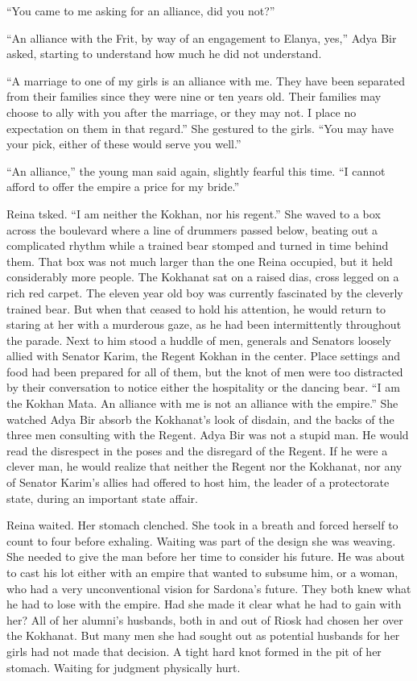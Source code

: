 \documentclass{article}
\begin{document}
	“You came to me asking for an alliance, did you not?”
	
	“An alliance with the Frit, by way of an engagement to Elanya, yes,” Adya Bir asked, starting to understand how much he did not understand.
	
	“A marriage to one of my girls is an alliance with me. They have been separated from their families since they were nine or ten years old. Their families may choose to ally with you after the marriage, or they may not. I place no expectation on them in that regard.” She gestured to the girls. “You may have your pick, either of these would serve you well.”
	
	“An alliance,” the young man said again, slightly fearful this time. “I cannot afford to offer the empire a price for my bride.” 
	
	Reina tsked. “I am neither the Kokhan, nor his regent.” She waved to a box across the boulevard where a line of drummers passed below, beating out a complicated rhythm while a trained bear stomped and turned in time behind them. That box was not much larger than the one Reina occupied, but it held considerably more people. The Kokhanat sat on a raised dias, cross legged on a rich red carpet. The eleven year old boy was currently fascinated by the cleverly trained bear. But when that ceased to hold his attention, he would return to staring at her with a murderous gaze, as he had been intermittently throughout the parade. Next to him stood a huddle of men, generals and Senators loosely allied with Senator Karim, the Regent Kokhan in the center. Place settings and food had been prepared for all of them, but the knot of men were too distracted by their conversation to notice either the hospitality or the dancing bear. “I am the Kokhan Mata. An alliance with me is not an alliance with the empire.” She watched Adya Bir absorb the Kokhanat’s look of disdain, and the backs of the three men consulting with the Regent. Adya Bir was not a stupid man. He would read the disrespect in the poses and the disregard of the Regent. If he were a clever man, he would realize that neither the Regent nor the Kokhanat, nor any of Senator Karim’s allies had offered to host him, the leader of a protectorate state, during an important state affair. 
	
	Reina waited. Her stomach clenched. She took in a breath and forced herself to count to four before exhaling. Waiting was part of the design she was weaving. She needed to give the man before her time to consider his future. He was about to cast his lot either with an empire that wanted to subsume him, or a woman, who had a very unconventional vision for Sardona’s future. They both knew what he had to lose with the empire. Had she made it clear what he had to gain with her? All of her alumni’s husbands, both in and out of Riosk had chosen her over the Kokhanat. But many men she had sought out as potential husbands for her girls had not made that decision. A tight hard knot formed in the pit of her stomach. Waiting for judgment physically hurt.
	
\end{document}

